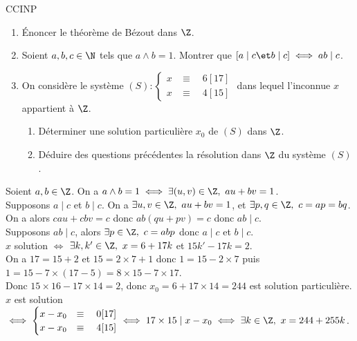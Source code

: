 \documentclass[11pt]{article}
\begin{document}
\begin{exercice}{CCINP  }{}
    \begin{enumerate}
        \item Énoncer le théorème de Bézout dans $\Z$.
        \item Soient $a,b,c\in \N$ tels que $a\land b = 1$. Montrer que $[a \mid c \et b \mid c] \iff ab \mid c$.
        \item On considère le système $(S):\begin{cases} x &\equiv \quad 6[17] \\ x &\equiv \quad 4[15]\end{cases}$ dans lequel l'inconnue $x$ appartient à $\Z$.
        \begin{enumerate}
            \item Déterminer une solution particulière $x_0$ de $(S)$ dans $\Z$.
            \item Déduire des questions précédentes la résolution dans $\Z$ du système $(S)$.
        \end{enumerate}
    \end{enumerate}
    \tcblower
     Soient $a,b\in \Z$. On a $a\land b = 1 \iff \exists (u,v)\in\Z, ~ au+bv=1$.\\
     Supposons $a\mid c$ et $b\mid c$. On a $\exists u,v \in \Z, ~ au+bv=1$, et $\exists p,q \in \Z, ~ c=ap=bq$.\\
    On a alors $cau+cbv=c$ donc $ab(qu+pv)=c$ donc $ab\mid c$.\\
     Supposons $ab\mid c$, alors $\exists p \in \Z, ~ c = abp$ donc $a\mid c$ et $b\mid c$.\\
     $x$ solution $\iff$ $\exists k,k' \in \Z, ~ x = 6 + 17k$ et $15k'-17k=2$.\\
    On a $17=15+2$ et $15=2\times7+1$ donc $1=15-2\times7$ puis $1=15-7\times (17 - 5)=8\times15-7\times17$.\\
    Donc $15\times16 - 17\times 14 = 2$, donc $x_0=6+17\times14=244$ est solution particulière.\\
     $x$ est solution $\iff \begin{cases}x-x_0 &\equiv \quad 0[17]\\ x-x_0 &\equiv \quad 4[15]\end{cases} \iff 17\times15 \mid x-x_0\iff \exists k \in \Z, ~ x = 244 + 255k$.
\end{exercice}

\vspace*{-0.4cm}
\end{document}
